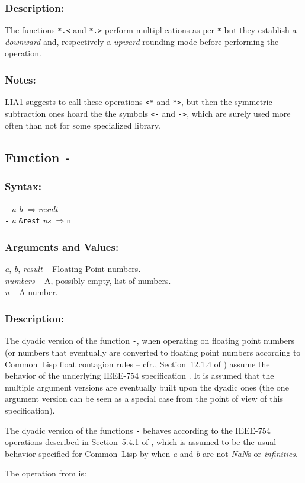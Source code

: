 \documentclass[10pt,fleqn]{article}
\newcommand{\CL}{\textsf{Common~Lisp}}
\newcommand{\code}[1]{\texttt{#1}}
\newcommand{\varname}[1]{\textit{#1}}
\newcommand{\RArrow}{$\Rightarrow$}
\newcommand{\IEEEFPStd}{IEEE-754}
\newcommand{\DDictionaryItem}[1]{\vspace*{6pt}\noindent\hrulefill\vspace*{-9pt}\subsection*{#1}}
\newcommand{\DSyntax}{\subsubsection*{Syntax:}}
\newcommand{\DArgsNValues}{\subsubsection*{Arguments and Values:}}
\newcommand{\DDescription}{\subsubsection*{Description:}}
\newcommand{\DNotes}{\subsubsection*{Notes:}}
\begin{document}
\DDescription{}

The functions  \code{*.<} and \code{*.>} perform multiplications as per \code{*}
but they establish a \emph{downward} and, respectively a
\emph{upward} rounding mode before performing the operation.

\DNotes{}

LIA1 suggests to call these operations \code{<*} and \code{*>}, but
then the symmetric subtraction ones hoard the the symbols \code{<-}
and \code{->}, which are surely used more often than not for some
specialized library.


\DDictionaryItem{Function \code{-}}
\index{*!\code{-}}

\DSyntax{}

\code{-} \varname{a} \varname{b} \RArrow \varname{result}\\
\code{-} \varname{a} \code{\&rest} \varname{ns} \RArrow \varname \code{n}\\

\DArgsNValues{}

\varname{a}, \varname{b}, \varname{result} -- Floating Point numbers.\\
\varname{numbers} -- A, possibly empty, list of numbers.\\
\varname{n} -- A number.

\DDescription{}

The dyadic version of the function \code{-}, when operating on
floating point numbers (or numbers that eventually are converted to
floating point numbers according to \CL{} float contagion rules -- cfr.,
Section~12.1.4 of \cite{1996:ANSIHyperSpec}) assume the behavior of the
underlying \IEEEFPStd{} specification \cite{2008:IEEE-754}.  It is assumed that
the multiple argument versions are eventually built upon the dyadic
ones (the one argument version can be seen as a special case from
the point of view of this specification).

The dyadic version of the functions \code{-} behaves
according to the \IEEEFPStd{} operations described in Section~5.4.1 of
\cite{2008:IEEE-754}, which is assumed to be the usual behavior specified
for \CL{} by \cite{1996:ANSIHyperSpec} when \varname{a} and \varname{b} are
not \emph{NaN}s or \emph{infinities}.

\noindent
The operation from \cite{2008:IEEE-754} is:

\vspace*{3mm}
\end{document}
